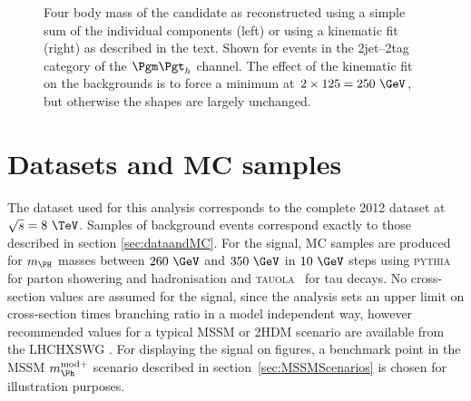 \begin{figure}
\begin{center}

\end{center}
\caption{
Four body mass of the candidate \PH as reconstructed using a simple sum of the
individual components (left) or using a kinematic fit (right) as
described in the text. Shown for events in the 2jet--2tag category of the
$\mutau$ channel. The effect of the kinematic fit on the backgrounds is to force
a minimum at $2\times125=250~\GeV$, but otherwise the shapes are largely
unchanged.}
\label{fig:kinfitvsmttbbstacked}
\end{figure} 

\section{Datasets and MC samples}
\label{sec:Hhhdatasets}

The dataset used for this analysis corresponds to the complete 2012 dataset at
$\sqrt{s}=8~\TeV$. Samples of background events correspond exactly to those
described in section \ref{sec:dataandMC}. For the signal, \ac{MC} samples are
produced for $m_{\PH}$ masses between $260~\GeV$ and $350~\GeV$ in $10~\GeV$
steps using \textsc{pythia}
for parton showering and hadronisation and \textsc{tauola}~\cite{TAUOLA} for tau
decays. No cross-section values are assumed for the signal, since the analysis
sets an upper limit on cross-section times branching ratio in a model
independent way, however recommended
values for a typical \ac{MSSM} or 2HDM scenario are available from the \ac{LHCHXSWG}
\cite{LHCHiggsCrossSectionWorkingGroup:2011ti,Dittmaier:2012vm,Heinemeyer:2013tqa}.
For displaying the signal on figures, a benchmark point in the \ac{MSSM}
$m_{\Ph}^{\text{mod+}}$ scenario described in section~\ref{sec:MSSMScenarios} is
chosen for illustration purposes.

